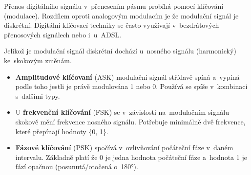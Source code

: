 Přenos digitálního signálu v~přenesením pásmu probíhá pomocí klíčování (modulace). Rozdílem oproti analogovým modulacím je že modulační signál je diskrétní. Digitální klíčovací techniky se často využívají v~bezdrátových přenosových signálech nebo i~u~ADSL.

Jelikož je modulační signál diskrétní dochází u~nosného signálu (harmonický) ke~skokovým změnám.

\begin{itemize}[noitemsep]
    \item \textbf{Amplitudové klíčovaní} (ASK) modulační signál střídavě spíná a~vypíná podle toho jestli je právě modulována 1 nebo 0. Používá se spíše v~kombinaci s~dalšími typy.
    \item U \textbf{frekvenční klíčování} (FSK) se v~závislosti na~modulačním signálu skokově mění frekvence nosného signálu. Potřebuje minimálně dvě frekvence, které přepínají hodnoty \{0, 1\}.
    \item \textbf{Fázové klíčování} (PSK) spočívá v~ovlivňování počáteční fáze v~daném intervalu. Základně platí že 0 je jedna hodnota počáteční fáze a~hodnota 1 je fází opačnou (posunutá/otočená o~180°).
\end{itemize}

